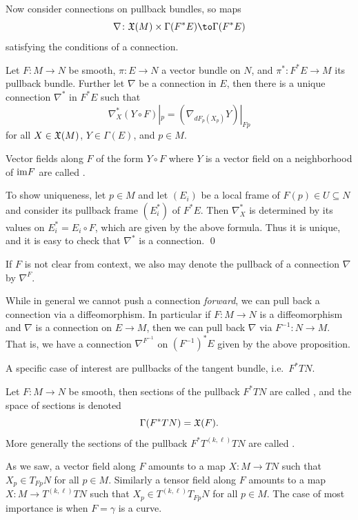 Now consider connections on pullback bundles, so maps
$$ \nabla\colon \X(M) \times \Gamma(F^*E) \to \Gamma(F^*E) $$
satisfying the conditions of a connection.

\bprop

    Let $F\colon M\to N$ be smooth, $\pi\colon E\to N$ a vector bundle on $N$, and $\pi^*\colon F^*E\to M$ its pullback bundle.
    Further let $\nabla$ be a connection in $E$, then there is a unique connection $\nabla^*$ in $F^*E$ such that
    $$ \nabla_X^*(Y\circ F)|_p = (\nabla_{dF_p(X_p)}Y)|_{Fp} $$
    for all $X\in{\frak X}(M)$, $Y\in\Gamma(E)$, and $p\in M$.

\eprop

\bnote

    Vector fields along $F$ of the form $Y\circ F$ where $Y$ is a vector field on a neighborhood of ${\rm im} F$ are called
    .

\enote

\bproof

    To show uniqueness, let $p\in M$ and let $(E_i)$ be a local frame of $F(p)\in U\subseteq N$ and consider its pullback frame $(E_i^*)$ of
    $F^*E$.
    Then $\nabla_X^*$ is determined by its values on $E_i^*=E_i\circ F$, which are given by the above formula.
    Thus it is unique, and it is easy to check that $\nabla^*$ is a connection.
    \qed

\eproof

If $F$ is not clear from context, we also may denote the pullback of a connection $\nabla$ by $\nabla^F$.

While in general we cannot push a connection {\it forward}, we can pull back a connection via a diffeomorphism.
In particular if $F\colon M\to N$ is a diffeomorphism and $\nabla$ is a connection on $E\to M$, then we can pull back $\nabla$
via $F^{-1}\colon N\to M$.
That is, we have a connection $\nabla^{F^{-1}}$ on $(F^{-1})^*E$ given by the above proposition.

A specific case of interest are pullbacks of the tangent bundle, i.e.\ $F^*TN$.

\bdefn

    Let $F\colon M\to N$ be smooth, then sections of the pullback $F^*TN$ are called , and the space of sections
    is denoted
    $$ \Gamma(F^*TN) = {\frak X}(F) . $$
    More generally the sections of the pullback $F^*T^{(k,\ell)}TN$ are called .

\edefn

As we saw, a vector field along $F$ amounts to a map $X\colon M\to TN$ such that $X_p\in T_{Fp}N$ for all $p\in M$.
Similarly a tensor field along $F$ amounts to a map $X\colon M\to T^{(k,\ell)}TN$ such that $X_p\in T^{(k,\ell)}T_{Fp}N$ for all $p\in M$.
The case of most importance is when $F=\gamma$ is a curve.

